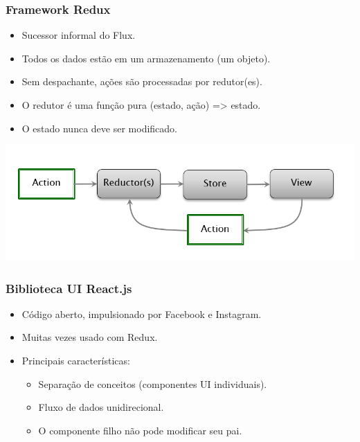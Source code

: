 \documentclass{beamer}
\begin{document}
\begin{frame}
      \frametitle{Framework Redux}

      \begin{itemize}
            \item Sucessor informal do Flux.
            \item Todos os dados estão em um armazenamento (um objeto).
            \item Sem despachante, ações são processadas por redutor(es).
            \item O redutor é uma função pura (estado, ação) => estado.
            \item O estado nunca deve ser modificado.
      \end{itemize}
      \begin{center}
            \includegraphics[width=0.8\linewidth]{assets/aula-tads-pdwa5/redux.png}
      \end{center}
\end{frame}
\begin{frame}
      \frametitle{Biblioteca UI React.js}
      
      \begin{itemize}
          \item Código aberto, impulsionado por Facebook e Instagram.
          \item Muitas vezes usado com Redux.
          \item Principais características:
          \begin{itemize}
              \item Separação de conceitos (componentes UI individuais).
              \item Fluxo de dados unidirecional.
              \item O componente filho não pode modificar seu pai.
          \end{itemize}
      \end{itemize}
      
      \end{frame}
      
\end{document}
